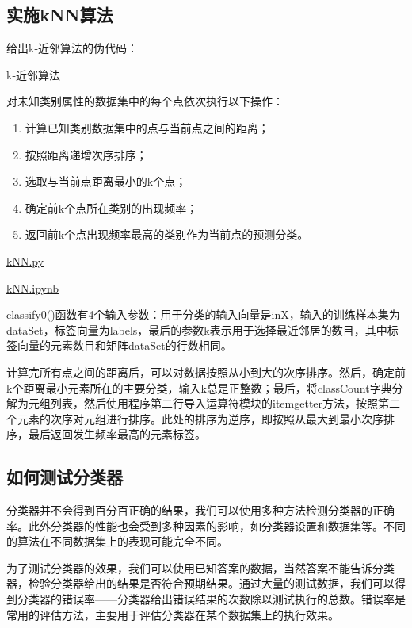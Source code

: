 \subsection{实施kNN算法}
给出k-近邻算法的伪代码：
\begin{algorithm}
    \caption{k-近邻算法}
    \label{kNN}
    对未知类别属性的数据集中的每个点依次执行以下操作：
    \begin{enumerate}
        \item 计算已知类别数据集中的点与当前点之间的距离；
        \item 按照距离递增次序排序；
        \item 选取与当前点距离最小的k个点；
        \item 确定前k个点所在类别的出现频率；
        \item 返回前k个点出现频率最高的类别作为当前点的预测分类。
    \end{enumerate}
\end{algorithm}

\begin{tcolorbox}[title=代码清单]
    \href{https://github.com/JPL-JUNO/Machine-Learning-in-Action/blob/main/Codes/kNN.py}{kNN.py}

    \href{https://github.com/JPL-JUNO/Machine-Learning-in-Action/blob/main/Codes/kNN.ipynb}{kNN.ipynb}
\end{tcolorbox}

classify0()函数有4个输入参数：用于分类的输入向量是inX，输入的训练样本集为dataSet，标签向量为labels，最后的参数k表示用于选择最近邻居的数目，其中标签向量的元素数目和矩阵dataSet的行数相同。

计算完所有点之间的距离后，可以对数据按照从小到大的次序排序。然后，确定前k个距离最小元素所在的主要分类，输入k总是正整数；最后，将classCount字典分解为元组列表，然后使用程序第二行导入运算符模块的itemgetter方法，按照第二个元素的次序对元组进行排序。此处的排序为逆序，即按照从最大到最小次序排序，最后返回发生频率最高的元素标签。
\subsection{如何测试分类器}

分类器并不会得到百分百正确的结果，我们可以使用多种方法检测分类器的正确率。此外分类器的性能也会受到多种因素的影响，如分类器设置和数据集等。不同的算法在不同数据集上的表现可能完全不同。

为了测试分类器的效果，我们可以使用已知答案的数据，当然答案不能告诉分类器，检验分类器给出的结果是否符合预期结果。通过大量的测试数据，我们可以得到分类器的错误率——分类器给出错误结果的次数除以测试执行的总数。错误率是常用的评估方法，主要用于评估分类器在某个数据集上的执行效果。


